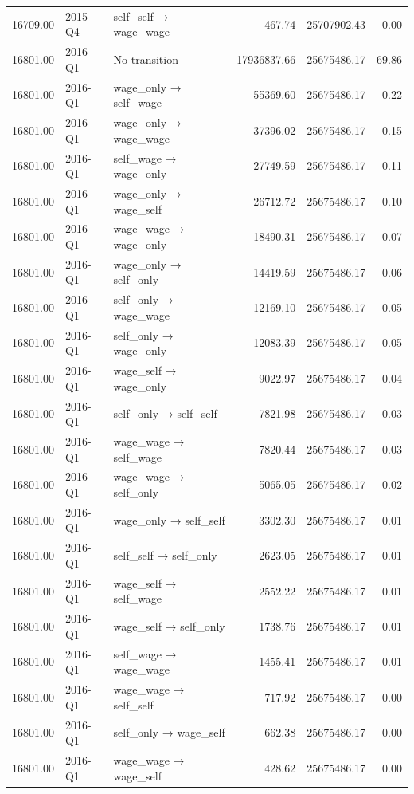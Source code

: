 \begin{table}[ht]
{\begin{tabular}{rllrrr}
  16709.00 & 2015-Q4 & self\_self → wage\_wage & 467.74 & 25707902.43 & 0.00 \\ 
  16801.00 & 2016-Q1 & No transition & 17936837.66 & 25675486.17 & 69.86 \\ 
  16801.00 & 2016-Q1 & wage\_only → self\_wage & 55369.60 & 25675486.17 & 0.22 \\ 
  16801.00 & 2016-Q1 & wage\_only → wage\_wage & 37396.02 & 25675486.17 & 0.15 \\ 
  16801.00 & 2016-Q1 & self\_wage → wage\_only & 27749.59 & 25675486.17 & 0.11 \\ 
  16801.00 & 2016-Q1 & wage\_only → wage\_self & 26712.72 & 25675486.17 & 0.10 \\ 
  16801.00 & 2016-Q1 & wage\_wage → wage\_only & 18490.31 & 25675486.17 & 0.07 \\ 
  16801.00 & 2016-Q1 & wage\_only → self\_only & 14419.59 & 25675486.17 & 0.06 \\ 
  16801.00 & 2016-Q1 & self\_only → wage\_wage & 12169.10 & 25675486.17 & 0.05 \\ 
  16801.00 & 2016-Q1 & self\_only → wage\_only & 12083.39 & 25675486.17 & 0.05 \\ 
  16801.00 & 2016-Q1 & wage\_self → wage\_only & 9022.97 & 25675486.17 & 0.04 \\ 
  16801.00 & 2016-Q1 & self\_only → self\_self & 7821.98 & 25675486.17 & 0.03 \\ 
  16801.00 & 2016-Q1 & wage\_wage → self\_wage & 7820.44 & 25675486.17 & 0.03 \\ 
  16801.00 & 2016-Q1 & wage\_wage → self\_only & 5065.05 & 25675486.17 & 0.02 \\ 
  16801.00 & 2016-Q1 & wage\_only → self\_self & 3302.30 & 25675486.17 & 0.01 \\ 
  16801.00 & 2016-Q1 & self\_self → self\_only & 2623.05 & 25675486.17 & 0.01 \\ 
  16801.00 & 2016-Q1 & wage\_self → self\_wage & 2552.22 & 25675486.17 & 0.01 \\ 
  16801.00 & 2016-Q1 & wage\_self → self\_only & 1738.76 & 25675486.17 & 0.01 \\ 
  16801.00 & 2016-Q1 & self\_wage → wage\_wage & 1455.41 & 25675486.17 & 0.01 \\ 
  16801.00 & 2016-Q1 & wage\_wage → self\_self & 717.92 & 25675486.17 & 0.00 \\ 
  16801.00 & 2016-Q1 & self\_only → wage\_self & 662.38 & 25675486.17 & 0.00 \\ 
  16801.00 & 2016-Q1 & wage\_wage → wage\_self & 428.62 & 25675486.17 & 0.00 \\ 

\end{tabular}}
\end{table}

